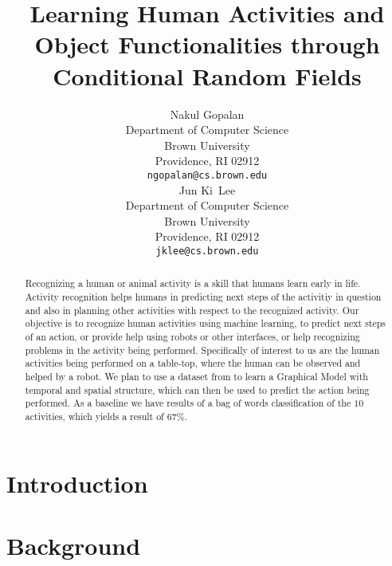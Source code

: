 \documentclass{article} %
\title{Learning Human Activities and Object Functionalities through Conditional Random Fields}
\author{
Nakul Gopalan\\
Department of Computer Science\\
Brown University\\
Providence, RI 02912 \\
\texttt{ngopalan@cs.brown.edu} \\
\And
Jun Ki~Lee\\
Department of Computer Science\\
Brown University\\
Providence, RI 02912 \\
\texttt{jklee@cs.brown.edu} \\
}
\begin{document}
\maketitle

\begin{abstract}
Recognizing a human or animal activity is a skill that humans learn early in life. Activity recognition helps humans in predicting next steps of the activitiy in question and also in planning other activities with respect to the recognized activity. Our objective is to recognize human activities using machine learning, to predict next steps of an action, or provide help using robots or other interfaces, or help recognizing problems in the activity being performed. Specifically of interest to us are the human activities being performed on a table-top, where the human can be observed and helped by a robot. We plan to use a dataset from \cite{koppula2013detectingactivitiesrgbd} to learn a Graphical Model with temporal and spatial structure, which can then be used to predict the action being performed. As a baseline we have results of a bag of words classification of the $10$ activities, which yields a result of $67\%$.
\end{abstract}

\section{Introduction}

\section{Background}
\end{document}
